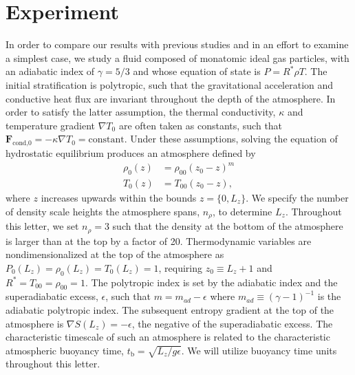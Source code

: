 \documentclass[aps, prl, twocolumn, groupedaddress, amsfonts, amssymb, amsmath]{revtex4-1}
\newcommand{\grad}{\ensuremath{\nabla}}
\begin{document}
\section{Experiment} 
\label{sec:experiment}
In order to compare our results with previous studies and in an effort to examine a simplest case,
we study a fluid composed of monatomic ideal gas particles, with an adiabatic index of $\gamma = 5/3$ and
whose equation of state is $P = R^*\rho T$. 
The initial stratification is polytropic, such that the gravitational
acceleration and conductive heat flux are invariant throughout the depth of the atmosphere. In order
to satisfy the latter assumption, the thermal conductivity, $\kappa$ and temperature gradient
$\grad T_0$ are often taken as constants, such that $\bm{F}_{\text{cond,0}} = -\kappa \grad T_0 = \text{constant}$.
Under these assumptions, solving the equation of hydrostatic equilibrium produces an atmosphere defined by
\begin{equation}
\begin{split}
\rho_0(z) &= \rho_{00}(z_0 - z)^m \\
T_0(z)    &= T_{00}(z_0 - z),
\label{eqn:polytrope}
\end{split}
\end{equation}
where $z$ increases upwards within the bounds $z =\{0, L_{z}\}$.
We specify the number of density scale heights the atmosphere spans, $n_\rho$, to determine $L_{z}$. Throughout
this letter, we set $n_{\rho} = 3$ such that the density at the bottom of the atmosphere is larger
than at the top by a factor of 20.
Thermodynamic variables are nondimensionalized at the top of the atmosphere as 
$P_0(L_z) = \rho_0(L_z) = T_0(L_z) = 1$, requiring $z_0 \equiv L_z + 1$ and $R^* = T_{00} = \rho_{00} = 1$.  
The polytropic index is set by the adiabatic index and the
superadiabatic excess, $\epsilon$, such that $m = m_{ad} - \epsilon$
where $m_{ad} \equiv (\gamma-1)^{-1}$ is the adiabatic polytropic index.
The subsequent entropy gradient at the top of the atmosphere is $\grad S(L_z) = -\epsilon$,
the negative of the superadiabatic excess.  The characteristic timescale of such an
atmosphere is related to the characteristic atmospheric buoyancy time, $t_{\text{b}} = \sqrt{L_z/g\epsilon}$.
We will utilize buoyancy time units throughout this letter.
\end{document}
